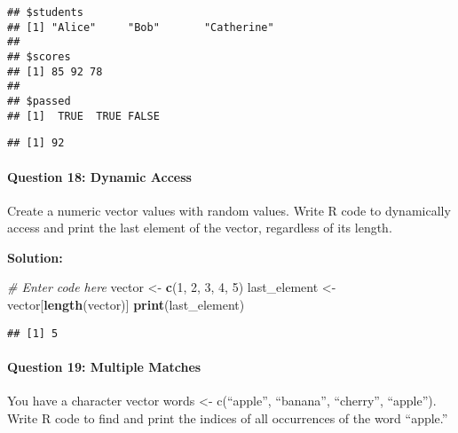 \documentclass[
]{article}
\newenvironment{Shaded}{\begin{snugshade}}{\end{snugshade}}
\newcommand{\CommentTok}[1]{\textcolor[rgb]{0.56,0.35,0.01}{\textit{#1}}}
\newcommand{\DecValTok}[1]{\textcolor[rgb]{0.00,0.00,0.81}{#1}}
\newcommand{\FunctionTok}[1]{\textcolor[rgb]{0.13,0.29,0.53}{\textbf{#1}}}
\newcommand{\NormalTok}[1]{#1}
\newcommand{\OtherTok}[1]{\textcolor[rgb]{0.56,0.35,0.01}{#1}}
\newcommand{\SpecialCharTok}[1]{\textcolor[rgb]{0.81,0.36,0.00}{\textbf{#1}}}
\begin{document}
\begin{verbatim}
## $students
## [1] "Alice"     "Bob"       "Catherine"
## 
## $scores
## [1] 85 92 78
## 
## $passed
## [1]  TRUE  TRUE FALSE
\end{verbatim}

\begin{Shaded}
\end{Shaded}

\begin{verbatim}
## [1] 92
\end{verbatim}

\hypertarget{question-18-dynamic-access}{%
\paragraph{Question 18: Dynamic
Access}\label{question-18-dynamic-access}}

Create a numeric vector values with random values. Write R code to
dynamically access and print the last element of the vector, regardless
of its length.

\textbf{Solution:}

\begin{Shaded}
\begin{Highlighting}[]
\CommentTok{\# Enter code here}
\NormalTok{vector }\OtherTok{\textless{}{-}} \FunctionTok{c}\NormalTok{(}\DecValTok{1}\NormalTok{, }\DecValTok{2}\NormalTok{, }\DecValTok{3}\NormalTok{, }\DecValTok{4}\NormalTok{, }\DecValTok{5}\NormalTok{)}
\NormalTok{last\_element }\OtherTok{\textless{}{-}}\NormalTok{ vector[}\FunctionTok{length}\NormalTok{(vector)]}
\FunctionTok{print}\NormalTok{(last\_element)}
\end{Highlighting}
\end{Shaded}

\begin{verbatim}
## [1] 5
\end{verbatim}

\hypertarget{question-19-multiple-matches}{%
\paragraph{Question 19: Multiple
Matches}\label{question-19-multiple-matches}}

You have a character vector words \textless- c(``apple'', ``banana'',
``cherry'', ``apple''). Write R code to find and print the indices of
all occurrences of the word ``apple.''
\end{document}
